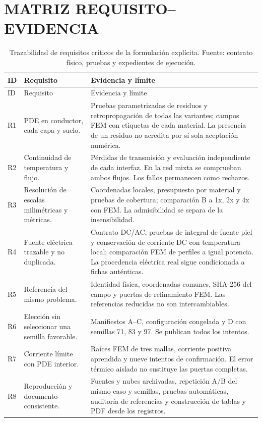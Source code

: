 \section{MATRIZ REQUISITO--EVIDENCIA}
\label{anx:requisito-evidencia}

\begin{longtable}{L{1cm}L{4.5cm}L{8cm}}
\caption{Trazabilidad de requisitos críticos de la formulación explícita. Fuente: contrato físico, pruebas y expedientes de ejecución.}\label{tab:explicit-requirements}\\
\toprule ID & Requisito & Evidencia y límite \\
\midrule\endfirsthead
\toprule ID & Requisito & Evidencia y límite \\
\midrule\endhead
R1 & PDE en conductor, cada capa y suelo. & Pruebas parametrizadas de residuos y retropropagación de todas las variantes; campos FEM con etiquetas de cada material. La presencia de un residuo no acredita por sí sola aceptación numérica. \\
R2 & Continuidad de temperatura y flujo. & Pérdidas de transmisión y evaluación independiente de cada interfaz. En la red mixta se comprueban ambos flujos. Los fallos permanecen como rechazos. \\
R3 & Resolución de escalas milimétricas y métricas. & Coordenadas locales, presupuesto por material y pruebas de cobertura; comparación B a 1x, 2x y 4x con FEM. La admisibilidad se separa de la insensibilidad. \\
R4 & Fuente eléctrica trazable y no duplicada. & Contrato DC/AC, pruebas de integral de fuente piel y conservación de corriente DC con temperatura local; comparación FEM de perfiles a igual potencia. La procedencia eléctrica real sigue condicionada a fichas auténticas. \\
R5 & Referencia del mismo problema. & Identidad física, coordenadas comunes, SHA-256 del campo y puertas de refinamiento FEM. Las referencias reducidas no son intercambiables. \\
R6 & Elección sin seleccionar una semilla favorable. & Manifiestos A--C, configuración congelada y D con semillas 71, 83 y 97. Se publican todos los intentos. \\
R7 & Corriente límite con PDE interior. & Raíces FEM de tres mallas, corriente positiva aprendida y nueve intentos de confirmación. El error térmico aislado no sustituye las puertas completas. \\
R8 & Reproducción y documento consistente. & Fuentes y nubes archivadas, repetición A/B del mismo caso y semillas, pruebas automáticas, auditoría de referencias y construcción de tablas y PDF desde los registros. \\
\bottomrule
\end{longtable}

